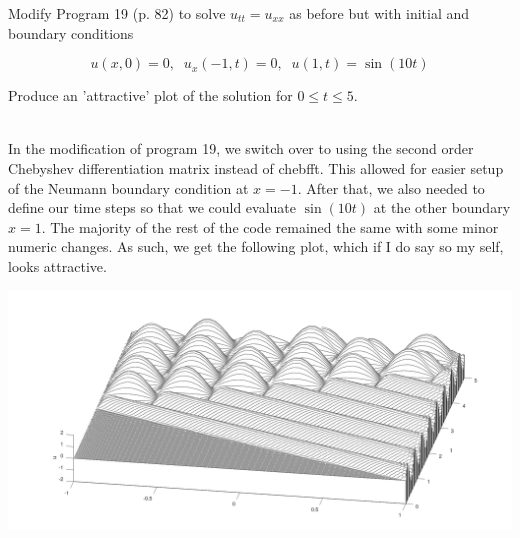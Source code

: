 Modify Program 19 (p. 82) to solve $u_{tt} = u_{xx}$ as before but with initial and boundary conditions

$$u(x,0)=0,\;\; u_x(-1,t)=0,\;\; u(1,t)=\sin(10t)$$

Produce an 'attractive' plot of the solution for $0\leq t\leq5$.\\

\begin{solution}\renewcommand{\qedsymbol}{}\ \\
    In the modification of program 19, we switch over to using the second order Chebyshev differentiation
    matrix instead of chebfft. This allowed for easier setup of the Neumann boundary condition at $x=-1$.
    After that, we also needed to define our time steps so that we could evaluate $\sin(10t)$ at the
    other boundary $x=1$. The majority of the rest of the code remained the same with some minor numeric
    changes. As such, we get the following plot, which if I do say so my self, looks attractive.
    
    \begin{center}
        \includegraphics[scale=0.25]{problem13_3.PNG}
    \end{center}
    
\end{solution}

\newpage

\newpage